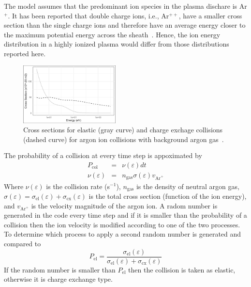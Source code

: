 The model assumes that the predominant ion species in the plasma dischare is Ar$^+$. It has been reported that double charge ions, i.e., Ar$^{++}$, have a smaller cross section than the single charge ions and therefore have an average energy closer to the maximum potential energy across the sheath~\cite{Davis1963}. Hence, the ion energy distribution in a highly ionized plasma would differ from those distributions reported here.     
	
\begin{figure}[htbp]
\centering
\includegraphics[width=0.45\textwidth]{Figures/CrossSections.jpg}
\caption{Cross sections for elastic (gray curve) and charge exchage collisions (dashed curve) for argon ion collisions with background argon gas~\cite{Phelps1994,LXCat}.}
\label{fig:CrossSectionsArgon}
\end{figure}

The probability of a collision at every time step is appoximated by
\begin{eqnarray}
P_{\text{col}} &=& \nu(\varepsilon) dt  \\
\nu(\varepsilon) &=& n_{\text{gas}} \sigma(\varepsilon) v_{\text{Ar}^+}
\end{eqnarray}
Where $\nu(\varepsilon)$ is the collision rate (s$^{-1}$), $n_{\text{gas}}$ is the density of neutral argon gas, $\sigma(\varepsilon) = \sigma_{\text{el}}(\varepsilon) + \sigma_{\text{cx}}(\varepsilon)$ is the total cross section (function of the ion energy), and $v_{\text{Ar}^+}$ is the velocity magnitude of the argon ion. A radom number is generated in the code every time step and if it is smaller than the probability of a collision then the ion velocity is modified according to one of the two processes. To determine which process to apply a second random number is generated and compared to 
\begin{equation}
P_{\text{el}} = \frac{\sigma_{\text{el}}(\varepsilon)}{\sigma_{\text{el}}(\varepsilon) + \sigma_{\text{cx}}(\varepsilon)}
\end{equation}
If the random number is smaller than $P_{\text{el}}$ then the collision is taken as elastic, otherwise it is charge exchange type. 

